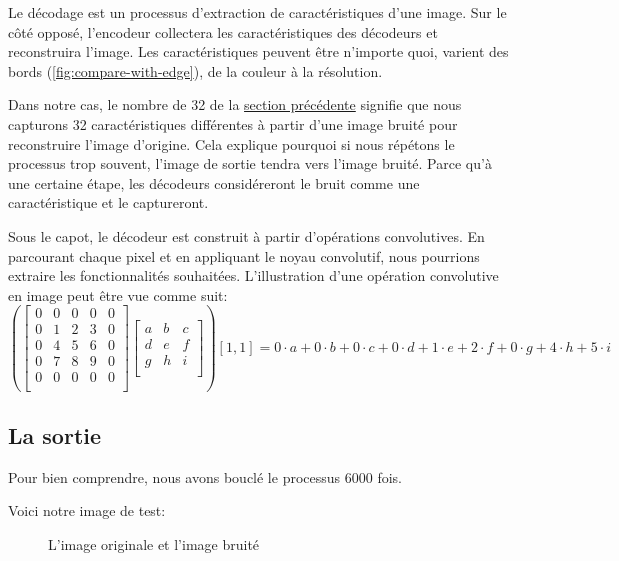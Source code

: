 \documentclass[
  11pt,
  dvipsnames]{article}
\begin{document}
Le décodage est un processus d'extraction de caractéristiques d'une image. Sur le côté opposé, l'encodeur collectera les caractéristiques des décodeurs et reconstruira l'image. Les caractéristiques peuvent être n'importe quoi, varient des bords (\ref{fig:compare-with-edge}), de la couleur à la résolution.

Dans notre cas, le nombre de 32 de la \protect\hyperlink{le-moduxe8le}{section précédente} signifie que nous capturons 32 caractéristiques différentes à partir d'une image bruité pour reconstruire l'image d'origine. Cela explique pourquoi si nous répétons le processus trop souvent, l'image de sortie tendra vers l'image bruité. Parce qu'à une certaine étape, les décodeurs considéreront le bruit comme une caractéristique et le captureront.

Sous le capot, le décodeur est construit à partir d'opérations convolutives. En parcourant chaque pixel et en appliquant le noyau convolutif, nous pourrions extraire les fonctionnalités souhaitées. L'illustration d'une opération convolutive en image peut être vue comme suit:
\[\left(\begin{bmatrix}
  0 & 0 & 0 & 0 & 0\\
  0 & 1 & 2 & 3 & 0\\
  0 & 4 & 5 & 6 & 0\\
  0 & 7 & 8 & 9 & 0\\
  0 & 0 & 0 & 0 & 0\\
\end{bmatrix}
\begin{bmatrix}
  a & b & c\\
  d & e & f\\
  g & h & i\\
\end{bmatrix}\right)[1, 1] =
0\cdot a + 0\cdot b + 0\cdot c +
0\cdot d + 1\cdot e + 2\cdot f +
0\cdot g + 4\cdot h + 5\cdot i
\]

\hypertarget{la-sortie}{%
\subsection{La sortie}\label{la-sortie}}

Pour bien comprendre, nous avons bouclé le processus 6000 fois.

Voici notre image de test:

\begin{figure}

{\centering {}

}

\caption{L'image originale et l'image bruité}\label{fig:noisy-original-image}
\end{figure}
\end{document}
